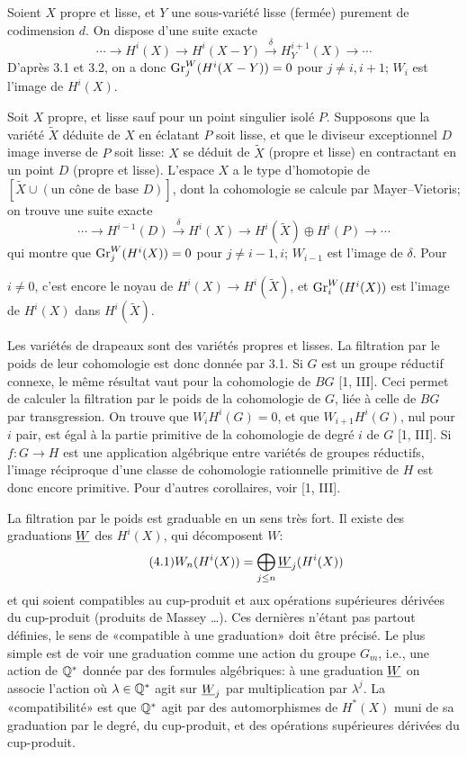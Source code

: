 \documentclass[8pt]{extarticle}
\begin{document}
 Soient \(X\) propre et lisse, et \(Y\) une sous-variété lisse (fermée) purement de codimension \(d\). On dispose d'une suite exacte
\[
\cdots\to H^i(X)\to H^i(X-Y)\xrightarrow{\delta}H_Y^{i+1}(X)\to\cdots
\]
D'après 3.1 et 3.2, on a donc \(\operatorname{Gr}_j^W(H^i(X-Y))=0\) pour \(j\ne i,i+1\); \(W_i\) est l'image de \(H^i(X)\).

 Soit \(X\) propre, et lisse sauf pour un point singulier isolé \(P\). Supposons que la variété \(\widetilde X\) déduite de \(X\) en éclatant \(P\) soit lisse, et que le diviseur exceptionnel \(D\) image inverse de \(P\) soit lisse: \(X\) se déduit de \(\widetilde X\) (propre et lisse) en contractant en un point \(D\) (propre et lisse). L'espace \(X\) a le type d'homotopie de \([\widetilde X\cup(\text{un cône de base }D)]\), dont la cohomologie se calcule par Mayer--Vietoris; on trouve une suite exacte
\[
\cdots\to H^{i-1}(D)\xrightarrow{\delta}H^i(X)\to H^i(\widetilde X)\oplus H^i(P)\to\cdots
\]
qui montre que \(\operatorname{Gr}_j^W(H^i(X))=0\) pour \(j\ne i-1,i\); \(W_{i-1}\) est l'image de \(\delta\). Pour
\EndSourcePage

\ReaderFont
\(i\ne0\), c'est encore le noyau de \(H^i(X)\to H^i(\widetilde X)\), et \(\operatorname{Gr}_i^W(H^i(X))\) est l'image de \(H^i(X)\) dans \(H^i(\widetilde X)\).

 Les variétés de drapeaux sont des variétés propres et lisses. La filtration par le poids de leur cohomologie est donc donnée par 3.1. Si \(G\) est un groupe réductif connexe, le même résultat vaut pour la cohomologie de \(BG\) [1, III]. Ceci permet de calculer la filtration par le poids de la cohomologie de \(G\), liée à celle de \(BG\) par transgression. On trouve que \(W_iH^i(G)=0\), et que \(W_{i+1}H^i(G)\), nul pour \(i\) pair, est égal à la partie primitive de la cohomologie de degré \(i\) de \(G\) [1, III]. Si \(f:G\to H\) est une application algébrique entre variétés de groupes réductifs, l'image réciproque d'une classe de cohomologie rationnelle primitive de \(H\) est donc encore primitive. Pour d'autres corollaires, voir [1, III].

 La filtration par le poids est graduable en un sens très fort. Il existe des graduations \(\underline{W}\) des \(H^i(X)\), qui décomposent \(W\):
\begin{equation}\tag{4.1}
W_n(H^i(X))=\bigoplus_{j\le n}\underline{W}_j(H^i(X))
\end{equation}
et qui soient compatibles au cup-produit et aux opérations supérieures dérivées du cup-produit (produits de Massey \ldots). Ces dernières n'étant pas partout définies, le sens de «compatible à une graduation» doit être précisé. Le plus simple est de voir une graduation comme une action du groupe \(G_m\), i.e., une action de \(\mathbb{Q}^*\) donnée par des formules algébriques: à une graduation \(\underline{W}\) on associe l'action où \(\lambda\in\mathbb{Q}^*\) agit sur \(\underline{W}_j\) par multiplication par \(\lambda^j\). La «compatibilité» est que \(\mathbb{Q}^*\) agit par des automorphismes de \(H^*(X)\) muni de sa graduation par le degré, du cup-produit, et des opérations supérieures dérivées du cup-produit.
\end{document}
